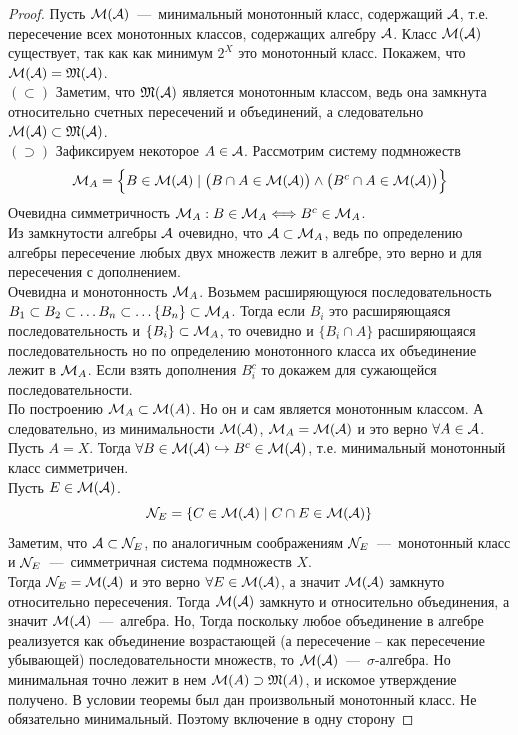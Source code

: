 \begin{proof}
    Пусть $\mathcal{M}(\mathcal{A})$~---~минимальный монотонный класс, содержащий $\mathcal{A}$, т.е. пересечение всех монотонных классов, содержащих алгебру $\mathcal{A}$. Класс $\mathcal{M}(\mathcal{A})$ существует, так как как минимум $2^X$ это монотонный класс. Покажем, что $\mathcal{M}(\mathcal{A}) = \mathfrak{M}(\mathcal{A})$. \\
    $(\subset)$ Заметим, что $\mathfrak{M}(\mathcal{A})$ является монотонным классом, ведь она замкнута относительно счетных пересечений и объединений, а следовательно $\mathcal{M}(\mathcal{A}) \subset \mathfrak{M}(\mathcal{A})$. \\
    $(\supset)$ Зафиксируем некоторое $A \in \mathcal{A}$. Рассмотрим систему подмножеств \[\mathcal{M}_A = \Big\{B \in \mathcal{M}(\mathcal{A}) \mid \big(B \cap A \in \mathcal{M}(\mathcal{A})\big) \wedge \big(B^c \cap A \in \mathcal{M}(\mathcal{A}) \big) \Big\}\]
    Очевидна симметричность $\mathcal{M}_A: B \in \mathcal{M}_A \Longleftrightarrow B^c \in \mathcal{M}_A$.\\
    Из замкнутости алгебры $\mathcal{A}$ очевидно, что $\mathcal{A} \subset \mathcal{M}_A$, ведь по определению алгебры пересечение любых двух множеств лежит в алгебре, это верно и для пересечения с дополнением.\\
    Очевидна и монотонность $\mathcal{M}_A$. Возьмем расширяющуюся последовательность $B_1 \subset B_2 \subset \ldots B_n \subset \ldots \{ B_n \} \subset \mathcal{M}_A$. Тогда если $B_i$ это расширяющаяся последовательность и $\{B_i\} \subset \mathcal{M}_A$, то очевидно и $\{B_i \cap A\}$ расширяющаяся последовательность но по определению монотонного класса их объединение лежит в $\mathcal{M}_A$. Если взять дополнения $B_i^c$ то докажем для сужающейся последовательности.\\
    По построению $\mathcal{M}_A \subset\mathcal{M}(A)$. Но он и сам является монотонным классом. А следовательно, из минимальности $\mathcal{M}(\mathcal{A})$, $\mathcal{M}_A = \mathcal{M}(\mathcal{A})$ и это верно $\forall A \in \mathcal{A}$.\\
    Пусть $A = X$. Тогда $\forall B \in \mathcal{M}(\mathcal{A}) \hookrightarrow B^c \in \mathcal{M}(\mathcal{A})$, т.е. минимальный монотонный класс симметричен. \\
    Пусть $E \in \mathcal{M}(\mathcal{A})$. \[\mathcal{N}_E = \{C \in \mathcal{M}(\mathcal{A}) \mid C \cap E \in \mathcal{M}(\mathcal{A})\}\]
    Заметим, что $\mathcal{A} \subset \mathcal{N}_E$, по аналогичным соображениям $\mathcal{N}_E$~---~монотонный класс и $\mathcal{N}_E$~---~симметричная система подмножеств $X$.\\
    Тогда $\mathcal{N}_E = \mathcal{M}(\mathcal{A})$ и это верно $\forall E \in \mathcal{M}(\mathcal{A})$, а значит $\mathcal{M}(\mathcal{A})$ замкнуто относительно пересечения. Тогда $\mathcal{M}(\mathcal{A})$ замкнуто и относительно объединения, а значит $\mathcal{M}(\mathcal{A})$~---~алгебра. Но, Тогда поскольку любое объединение в алгебре реализуется как объединение возрастающей (а пересечение -- как пересечение убывающей) последовательности множеств, то $\mathcal{M}(\mathcal{A})$~---~$\sigma$-алгебра. Но минимальная точно лежит в нем $\mathcal{M}(A) \supset \mathfrak{M}(A)$, и искомое утверждение получено. В условии теоремы был дан произвольный монотонный класс. Не обязательно минимальный. Поэтому включение в одну сторону
\end{proof}
